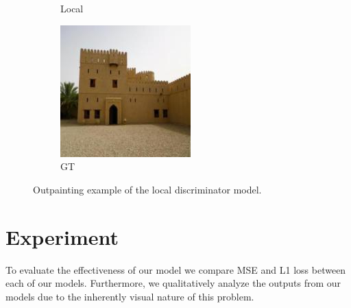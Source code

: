 \documentclass{article}
\begin{document}
\begin{figure}
\begin{subfigure}[b]{0.15\textwidth}
        \caption{Local}
    \end{subfigure}
    \hfill
    \begin{subfigure}[b]{0.15\textwidth}
        \includegraphics[width=\textwidth]{figs/fig3/ground_truth}
        \caption{GT}
    \end{subfigure}
  	\caption{Outpainting example of the local discriminator model.}
  	\label{fig:fig3}
\end{figure}

\section{Experiment}
To evaluate the effectiveness of our model we compare MSE and L1 loss between each of our models. Furthermore, we qualitatively analyze the outputs from our models due to the inherently visual nature of this problem.
\end{document}
